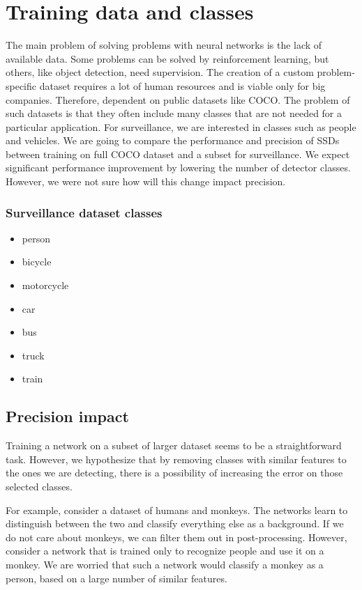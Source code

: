 \section{Training data and classes}
The main problem of solving problems with neural networks is the lack of available data. Some problems can be solved by reinforcement learning, but others, like object detection, need supervision. The creation of a custom problem-specific dataset requires a lot of human resources and is viable only for big companies. Therefore, dependent on public datasets like COCO. The problem of such datasets is that they often include many classes that are not needed for a particular application. For surveillance, we are interested in classes such as people and vehicles. We are going to compare the performance and precision of SSDs between training on full COCO dataset and a subset for surveillance. We expect significant performance improvement by lowering the number of detector classes. However, we were not sure how will this change impact precision. 

\subsubsection{Surveillance dataset classes}
\begin{multicols}{2}
    \begin{itemize}
        \item person
        \item bicycle
        \item motorcycle
        \item car
        \item bus
        \item truck
        \item train
    \end{itemize}
\end{multicols}

\subsection{Precision impact}
Training a network on a subset of larger dataset seems to be a straightforward task. However, we hypothesize that by removing classes with similar features to the ones we are detecting, there is a possibility of increasing the error on those selected classes. 

For example, consider a dataset of humans and monkeys. The networks learn to distinguish between the two and classify everything else as a background. If we do not care about monkeys, we can filter them out in post-processing. However, consider a network that is trained only to recognize people and use it on a monkey. We are worried that such a network would classify a monkey as a person, based on a large number of similar features. 

